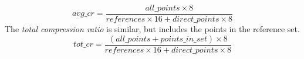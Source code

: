 \begin{equation}\label{eq:avg_cr}
    avg\_cr = \frac{all\_points \times 8}{references \times 16 + direct\_points \times 8}
\end{equation}
The \textit{total compression ratio} is similar, but includes the points in the reference set.
\begin{equation}\label{eq:tot_cr}
    tot\_cr = \frac{(all\_points + points\_in\_set) \times 8}{references \times 16 + direct\_points \times 8}
\end{equation}

